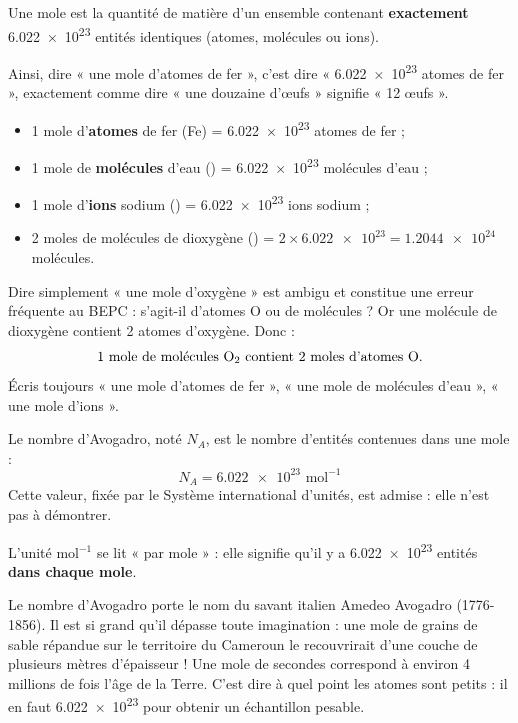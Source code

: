 \documentclass[11pt]{article}
\newcommand{\cle}[1]{{\popxbold\color{popdark}#1}}
\newcounter{popsec}
\newcounter{popsub}
\newcommand{\courssub}[1]{%
  \stepcounter{popsub}%
  \par\vspace{9pt}\noindent{\popxbold\fontsize{11.5}{13}\selectfont\color{popink}{\color{poporange}\thepopsec.\thepopsub}\hspace{6pt}#1}\par\nopagebreak\vspace{4pt}
}
\begin{document}
\begin{definition}[La mole]
Une \cle{mole} est la quantité de matière d'un ensemble contenant \textbf{exactement} \num{6,022e23} entités identiques (atomes, molécules ou ions).
\end{definition}

Ainsi, dire « une mole d'atomes de fer », c'est dire « \num{6,022e23} atomes de fer », exactement comme dire « une douzaine d'œufs » signifie « 12 œufs ».

\begin{exemplebox}
\begin{itemize}
\item 1 mole d'\textbf{atomes} de fer (Fe) = \num{6,022e23} atomes de fer ;
\item 1 mole de \textbf{molécules} d'eau () = \num{6,022e23} molécules d'eau ;
\item 1 mole d'\textbf{ions} sodium () = \num{6,022e23} ions sodium ;
\item 2 moles de molécules de dioxygène () = $2 \times \num{6,022e23} = \num{1,2044e24}$ molécules.
\end{itemize}
\end{exemplebox}

\begin{attention}
Dire simplement « une mole d'oxygène » est ambigu et constitue une erreur fréquente au BEPC : s'agit-il d'atomes O ou de molécules  ? Or une molécule de dioxygène  contient 2 atomes d'oxygène. Donc :
\[ \text{1 mole de molécules } \ce{O2} \text{ contient 2 moles d'atomes O.} \]
Écris toujours « une mole d'atomes de fer », « une mole de molécules d'eau », « une mole d'ions  ».
\end{attention}

\courssub{Le nombre d'Avogadro}

\begin{definition}
Le \cle{nombre d'Avogadro}, noté \cle{$N_A$}, est le nombre d'entités contenues dans une mole :
\[ N_A = \num{6,022e23} \text{ mol}^{-1} \]
Cette valeur, fixée par le Système international d'unités, est admise : elle n'est pas à démontrer.
\end{definition}

L'unité mol$^{-1}$ se lit « par mole » : elle signifie qu'il y a \num{6,022e23} entités \textbf{dans chaque mole}.

\begin{savaistu}
Le nombre d'Avogadro porte le nom du savant italien Amedeo Avogadro (1776-1856). Il est si grand qu'il dépasse toute imagination : une mole de grains de sable répandue sur le territoire du Cameroun le recouvrirait d'une couche de plusieurs mètres d'épaisseur ! Une mole de secondes correspond à environ 4 millions de fois l'âge de la Terre. C'est dire à quel point les atomes sont petits : il en faut \num{6,022e23} pour obtenir un échantillon pesable.
\end{savaistu}
\end{document}
